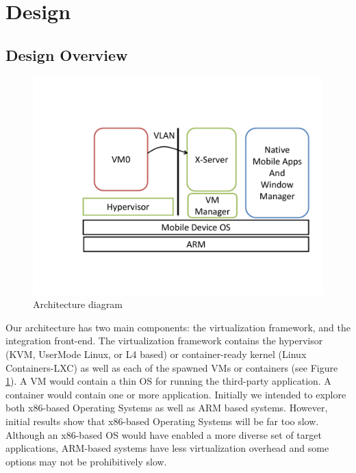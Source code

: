 \section{Design}
\label{sec:design}
\subsection{Design Overview}

\begin{figure}[tbh]
\centering
\includegraphics[width=1.0\columnwidth]{arch}
\caption{Architecture diagram}
\label{fig:arch}
\end{figure}

\label{sec:proposedarch}
Our architecture has two main components: the virtualization framework, and the integration front-end.  The virtualization framework contains the hypervisor (KVM, UserMode Linux, or L4 based) or container-ready kernel (Linux Containers-LXC) as well as each of the spawned VMs or containers (see Figure \ref{fig:arch}).  A VM would contain a thin OS for running the third-party application.  A container would contain one or more application.  Initially we intended to explore both x86-based Operating Systems as well as ARM based systems.  However, initial results show that x86-based Operating Systems will be far too slow.  Although an x86-based OS would have enabled a more diverse set of target applications, ARM-based systems have less virtualization overhead and some options may not be prohibitively slow. %

